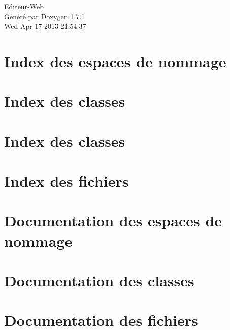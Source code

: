 \documentclass[a4paper]{book}
\begin{document}
\hypersetup{pageanchor=false}
\begin{titlepage}
\vspace*{7cm}
\begin{center}
{\Large Editeur-\/Web }\\
\vspace*{1cm}
{\large Généré par Doxygen 1.7.1}\\
\vspace*{0.5cm}
{\small Wed Apr 17 2013 21:54:37}\\
\end{center}
\end{titlepage}
\clearemptydoublepage
{}
\tableofcontents
\clearemptydoublepage
{}
\hypersetup{pageanchor=true}
\chapter{Index des espaces de nommage}

\chapter{Index des classes}

\chapter{Index des classes}

\chapter{Index des fichiers}

\chapter{Documentation des espaces de nommage}

\chapter{Documentation des classes}









\chapter{Documentation des fichiers}







\printindex
\end{document}

